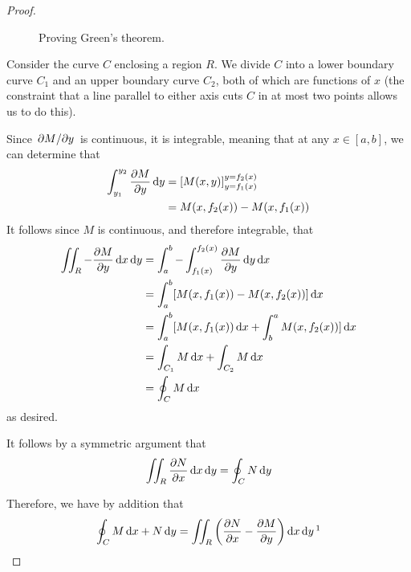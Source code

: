 \documentclass[../main.tex]{subfiles}
\begin{document}
\begin{itemize}
\begin{thm}
\begin{proof}
\begin{figure}[h!]
                \caption{Proving Green's theorem.}
                \label{fig:GreensTheorem}
            \end{figure}\par
            Consider the curve $C$ enclosing a region $R$. We divide $C$ into a lower boundary curve $C_1$ and an upper boundary curve $C_2$, both of which are functions of $x$ (the constraint that a line parallel to either axis cuts $C$ in at most two points allows us to do this).\par
            Since $\pdv*{M}{y}$ is continuous, it is integrable, meaning that at any $x\in[a,b]$, we can determine that
            \begin{align*}
                \int_{y_1}^{y_2}\pdv{M}{y}\dd{y} &= \left[ M(x,y) \right]_{y=f_1(x)}^{y=f_2(x)}\\
                &= M(x,f_2(x))-M(x,f_1(x))
            \end{align*}
            It follows since $M$ is continuous, and therefore integrable, that
            \begin{align*}
                \iint_R-\pdv{M}{y}\dd{x}\dd{y} &= \int_a^b-\int_{f_1(x)}^{f_2(x)}\pdv{M}{y}\dd{y}\dd{x}\\
                &= \int_a^b[M(x,f_1(x))-M(x,f_2(x))]\dd{x}\\
                &= \int_a^b[M(x,f_1(x))\dd{x}+\int_b^aM(x,f_2(x))]\dd{x}\\
                &= \int_{C_1}M\dd{x}+\int_{C_2}M\dd{x}\\
                &= \oint_CM\dd{x}
            \end{align*}
            as desired.\par
            It follows by a symmetric argument that
            \begin{equation*}
                \iint_R\pdv{N}{x}\dd{x}\dd{y} = \oint_CN\dd{y}
            \end{equation*}\par
            Therefore, we have by addition that
            \begin{equation*}
                \oint_CM\dd{x}+N\dd{y} = \iint_R\left( \pdv{N}{x}-\pdv{M}{y} \right)\dd{x}\dd{y}\footnotemark

\end{equation*}
\end{proof}
\end{thm}
\end{itemize}
\end{document}
